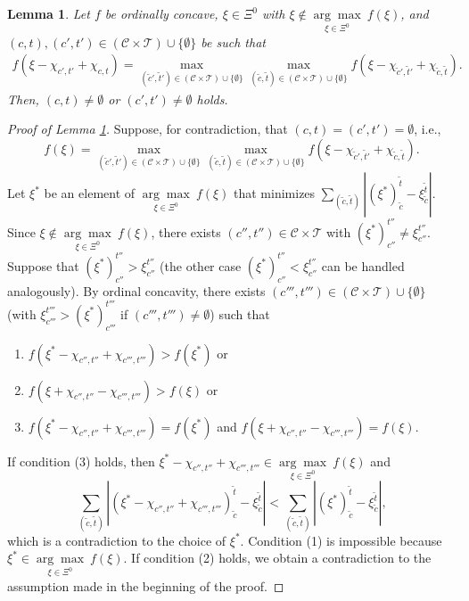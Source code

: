 \documentclass[12pt]{amsart}
\newtheorem{lemma}{Lemma}
\theoremstyle{remark}
\begin{document}
\begin{lemma} \label{lem:maximizer-cut-2}
Let $f$ be ordinally concave, $\xi \in \Xi^0$ with $\xi\notin \underset {\xi\in \Xi^0} {\arg\max} \: f(\xi)$, and $(c,t), (c',t')\in (\mathcal{C}\times \mathcal{T})\cup\{\emptyset\}$ be such that
\begin{align*}
f(\xi-\chi_{c',t'}+\chi_{c,t})=\max_{(\tilde c', \tilde t')\in (\mathcal{C}\times \mathcal{T})\cup\{\emptyset\}}\max_{(\tilde c, \tilde t)\in (\mathcal{C}\times \mathcal{T})\cup\{\emptyset\}}f(\xi-\chi_{\tilde c', \tilde t'}+\chi_{\tilde c, \tilde t}).
\end{align*}
Then, $(c,t)\neq \emptyset$ or $(c',t')\neq \emptyset$ holds.
\end{lemma}
\begin{proof}[Proof of Lemma \ref{lem:maximizer-cut-2}]\renewcommand{\qedsymbol}{$\blacksquare$}
Suppose, for contradiction, that $(c,t)=(c',t')=\emptyset$, i.e.,
$$
f(\xi)=\max_{(\tilde c', \tilde t')\in (\mathcal{C}\times \mathcal{T})\cup\{\emptyset\}}\max_{(\tilde c, \tilde t)\in (\mathcal{C}\times \mathcal{T})\cup\{\emptyset\}}f(\xi-\chi_{\tilde c', \tilde t'}+\chi_{\tilde c, \tilde t}).
$$
Let $\xi^*$ be an element of $\underset {\xi\in \Xi^0} {\arg\max} \: f(\xi)$ that minimizes $\sum_{(\tilde c, \tilde t)}|(\xi^*)_{\tilde c}^{\tilde t}-\xi_{\tilde c}^{\tilde t}|$. Since $\xi\notin \underset {\xi\in \Xi^0} {\arg\max} \: f(\xi)$, there exists $(c'',t'')\in \mathcal{C}\times \mathcal{T}$ with $(\xi^*)_{c''}^{t''}\neq \xi_{c''}^{t''}$. Suppose that  $(\xi^*)_{c''}^{t''}>\xi_{c''}^{t''}$ (the other case $(\xi^*)_{c''}^{t''}<\xi_{c''}^{t''}$ can be handled analogously). By ordinal concavity, there exists $(c''',t''')\in (\mathcal{C}\times \mathcal{T})\cup\{\emptyset\}$ (with $\xi_{c'''}^{t'''}>(\xi^*)_{c'''}^{t'''}$ if $(c''',t''')\neq \emptyset$) such that
\begin{enumerate}
\item $f(\xi^*-\chi_{c'',t''}+\chi_{c''',t'''})>f(\xi^*)$ or
\item $f(\xi+\chi_{c'',t''}-\chi_{c''',t'''})>f(\xi)$ or
\item $f(\xi^*-\chi_{c'',t''}+\chi_{c''',t'''})=f(\xi^*)$ and $f(\xi+\chi_{c'',t''}-\chi_{c''',t'''})=f(\xi)$.
\end{enumerate}
If condition (3) holds, then $\xi^*-\chi_{c'',t''}+\chi_{c''',t'''}\in \underset {\xi\in \Xi^0} {\arg\max} \: f(\xi)$ and
$$
\sum_{(\tilde c, \tilde t)}|(\xi^*-\chi_{c'',t''}+\chi_{c''',t'''})_{\tilde c}^{\tilde t}-\xi_{\tilde c}^{\tilde t}|<\sum_{(\tilde c, \tilde t)}|(\xi^*)_{\tilde c}^{\tilde t}-\xi_{\tilde c}^{\tilde t}|,
$$
which is a contradiction to the choice of
$\xi^*$. Condition (1) is impossible because $\xi^*\in \underset {\xi\in \Xi^0} {\arg\max} \: f(\xi)$. If condition (2) holds, we obtain a contradiction to the assumption made in the beginning of the proof.
\end{proof}
\end{document}
